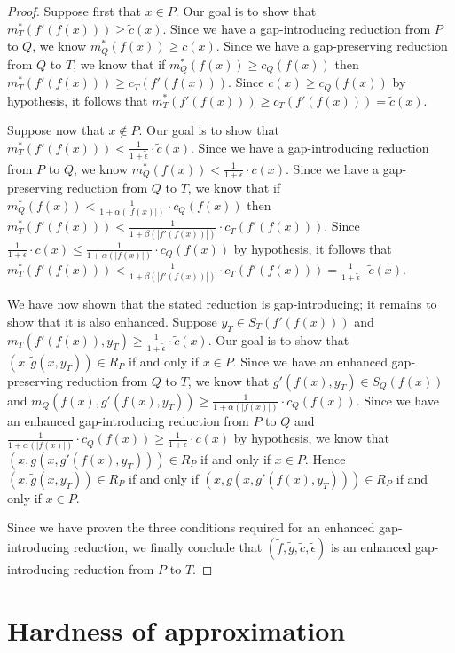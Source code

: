 \documentclass[]{article}
\theoremstyle{plain}
\theoremstyle{definition}
\begin{document}
\begin{proof}
  Suppose first that $x \in P$.
  Our goal is to show that $m^*_T(f'(f(x))) \geq \tilde{c}(x)$.
  Since we have a gap-introducing reduction from $P$ to $Q$, we know $m^*_Q(f(x)) \geq c(x)$.
  Since we have a gap-preserving reduction from $Q$ to $T$, we know that if $m^*_Q(f(x)) \geq c_Q(f(x))$ then $m^*_T(f'(f(x))) \geq c_T(f'(f(x)))$.
  Since $c(x) \geq c_Q(f(x))$ by hypothesis, it follows that $m^*_T(f'(f(x))) \geq c_T(f'(f(x))) = \tilde{c}(x)$.

  Suppose now that $x \notin P$.
  Our goal is to show that $m^*_T(f'(f(x))) < \frac{1}{1 + \tilde{\epsilon}} \cdot \tilde{c}(x)$.
  Since we have a gap-introducing reduction from $P$ to $Q$, we know $m^*_Q(f(x)) < \frac{1}{1 + \epsilon} \cdot c(x)$.
  Since we have a gap-preserving reduction from $Q$ to $T$, we know that if $m^*_Q(f(x)) < \frac{1}{1 + \alpha(|f(x)|)} \cdot c_Q(f(x))$ then $m^*_T(f'(f(x))) < \frac{1}{1 + \beta(|f'(f(x))|)} \cdot c_T(f'(f(x)))$.
  Since $\frac{1}{1 + \epsilon} \cdot c(x) \leq \frac{1}{1 + \alpha(|f(x)|)} \cdot c_Q(f(x))$ by hypothesis, it follows that $m^*_T(f'(f(x))) < \frac{1}{1 + \beta(|f'(f(x))|)} \cdot c_T(f'(f(x))) = \frac{1}{1 + \tilde{\epsilon}} \cdot \tilde{c}(x)$.

  We have now shown that the stated reduction is gap-introducing; it remains to show that it is also enhanced.
  Suppose $y_T \in S_T(f'(f(x)))$ and $m_T(f'(f(x)), y_T) \geq \frac{1}{1 + \tilde{\epsilon}} \cdot \tilde{c}(x)$.
  Our goal is to show that $(x, \tilde{g}(x, y_T)) \in R_P$ if and only if $x \in P$.
  Since we have an enhanced gap-preserving reduction from $Q$ to $T$, we know that $g'(f(x), y_T) \in S_Q(f(x))$ and $m_Q(f(x), g'(f(x), y_T)) \geq \frac{1}{1 + \alpha(|f(x)|)} \cdot c_Q(f(x))$.
  Since we have an enhanced gap-introducing reduction from $P$ to $Q$ and $\frac{1}{1 + \alpha(|f(x)|)} \cdot c_Q(f(x)) \geq \frac{1}{1 + \epsilon} \cdot c(x)$ by hypothesis, we know that $(x, g(x, g'(f(x), y_T))) \in R_P$ if and only if $x \in P$.
  Hence $(x, \tilde{g}(x, y_T)) \in R_P$ if and only if $(x, g(x, g'(f(x), y_T))) \in R_P$ if and only if $x \in P$.

  Since we have proven the three conditions required for an enhanced gap-introducing reduction, we finally conclude that $(\tilde{f}, \tilde{g}, \tilde{c}, \tilde{\epsilon})$ is an enhanced gap-introducing reduction from $P$ to $T$.
\end{proof}

\section{Hardness of approximation}\label{sec:hardness}
\end{document}
